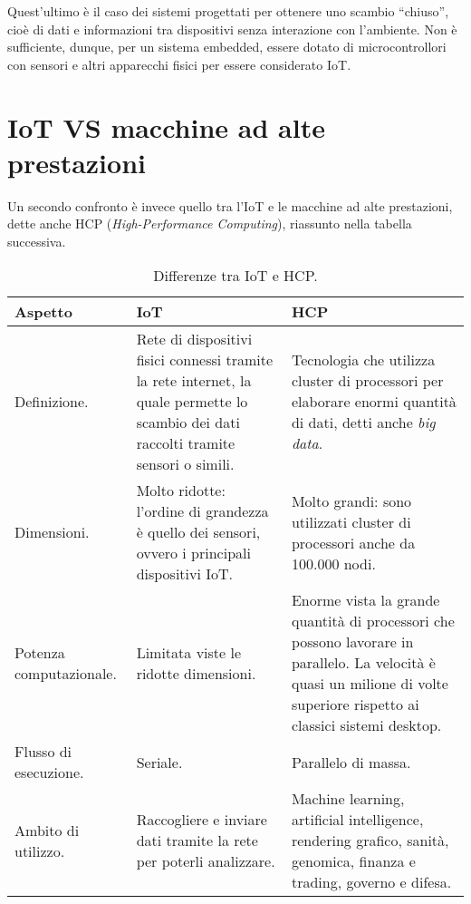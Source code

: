 \noindent Quest'ultimo è il caso dei sistemi progettati per ottenere uno scambio ``chiuso'', cioè di dati e informazioni tra dispositivi senza interazione con l’ambiente. Non è sufficiente, dunque, per un sistema embedded, essere dotato di microcontrollori con sensori e altri apparecchi fisici per essere considerato IoT\cite{iot-embedded}.

\section{IoT VS macchine ad alte prestazioni}

Un secondo confronto è invece quello tra l'IoT e le macchine ad alte prestazioni, dette anche HCP (\textit{High-Performance Computing})\cite{hcp}, riassunto nella tabella successiva.

\begin{table}[H]
    \centering
	\begin{tabular}{|m{}<{\centering}||m{}<{\centering}|m{}<{\centering}|}
		\hline
		\textbf{Aspetto} & \textbf{IoT} & \textbf{HCP} \\
        \hline \hline
        Definizione. & Rete di dispositivi fisici connessi tramite la rete internet, la quale permette lo scambio dei dati raccolti tramite sensori o simili. & Tecnologia che utilizza cluster di processori per elaborare enormi quantità di dati, detti anche \textit{big data}. \\ 
        \hline
        Dimensioni. & Molto ridotte: l'ordine di grandezza è quello dei sensori, ovvero i principali dispositivi IoT. & Molto grandi: sono utilizzati cluster di processori anche da 100.000 nodi. \\
        \hline
        Potenza computazionale. & Limitata viste le ridotte dimensioni. & Enorme vista la grande quantità di processori che possono lavorare in parallelo. La velocità è quasi un milione di volte superiore rispetto ai classici sistemi desktop. \\
        \hline
        Flusso di esecuzione. & Seriale. & Parallelo di massa. \\
        \hline
        Ambito di utilizzo. & Raccogliere e inviare dati tramite la rete per poterli analizzare. & Machine learning, artificial intelligence, rendering grafico, sanità, genomica, finanza e trading, governo e difesa. \\
		\hline
    \end{tabular}
    \caption{Differenze tra IoT e HCP.}
\end{table}

